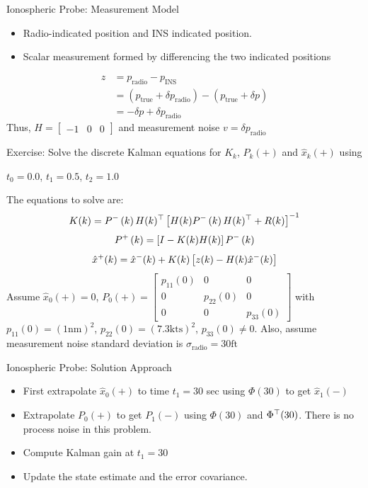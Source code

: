 \documentclass{beamer}
\begin{document}
\begin{frame}
Ionospheric Probe: Measurement Model
\begin{itemize}
\item Radio-indicated position and INS indicated position.
\item Scalar measurement formed by differencing the two indicated positions
\end{itemize}
\begin{align*}
z &= p_{\text{radio}} - p_{\text{INS}}\\
  &= (p_{\text{true}}+\delta p_{\text{radio}}) -
(p_{\text{true}}+\delta p)\\
  &=-\delta p + \delta p_{\text{radio}}
\end{align*}
Thus, $H=\begin{bmatrix}-1&0&0\end{bmatrix}$ and measurement noise $v=\delta p_{\text{radio}}$
\end{frame}

\begin{frame}
Exercise:  Solve the discrete Kalman equations for $K_k$, $P_k(+)$ and $\hat{x}_k(+)$ using

$t_0=0.0$, $t_1=0.5$, $t_2=1.0$

The equations to solve are:
\[K(k)=P^{-}\left( k \right)H(k)^\top\left[H(k)P^{-}\left( k \right)H(k)^\top + R(k)\right]^{-1}\]
\[P^{+}\left( k \right)=\left[I-K(k)H(k)\right]P^{-}\left( k \right)\]
\[\hat{x}^{+}(k)=\hat{x}^{-}(k)+K(k)\left[z(k)-H(k)\hat{x}^{-}(k)\right]\]
Assume $\hat{x}_0(+)=0$, $P_0(+)=\begin{bmatrix}
p_{11}(0)&0&0\\
0&p_{22}(0)&0\\
0&0&p_{33}(0)
\end{bmatrix}$
with $p_{11}(0)=(1 \text{nm})^2$, $p_{22}(0)=(7.3 \text{kts})^2$, $p_{33}(0)\neq 0$.  Also, assume measurement noise standard deviation is $\sigma_{\text{radio}}= 30 \text{ft}$
\end{frame}

\begin{frame}
Ionospheric Probe: Solution Approach
\begin{itemize}
  \item First extrapolate $\hat{x}_0(+)$ to time $t_1=30$ sec using $\Phi(30)$ to get $\hat{x}_1(-)$
  \item Extrapolate $P_0(+)$ to get $P_1(-)$ using $\Phi(30)$ and $\Phi^\top(30)$.  There is no process noise in this problem.
  \item Compute Kalman gain at $t_1=30$
  \item Update the state estimate and the error covariance.
\end{itemize} 
\end{frame}
\end{document}

